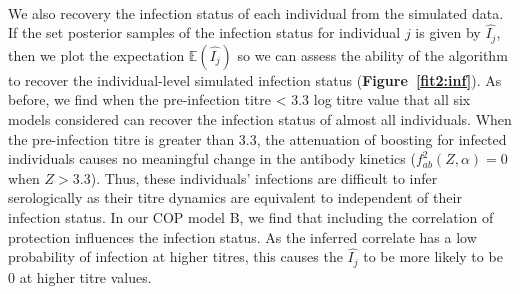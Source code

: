 \paragraph{}We also recovery the infection status of each individual from the simulated data. If the set posterior samples of the infection status for individual $j$ is given by $\hat{I_j} $, then we plot the expectation $\mathbb{E}(\hat{I_j} )$ so we can assess the ability of the algorithm to recover the individual-level simulated infection status (\textbf{Figure~\ref{fit2:inf}}). As before, we find when the pre-infection titre < 3.3 log titre value that all six models considered can recover the infection status of almost all individuals. When the pre-infection titre is greater than 3.3, the attenuation of boosting for infected individuals causes no meaningful change in the antibody kinetics ($f^2_{ab}(Z, \alpha) = 0$ when $Z > 3.3$). Thus, these individuals' infections are difficult to infer serologically as their titre dynamics are equivalent to independent of their infection status. In our COP model B, we find that including the correlation of protection influences the infection status. As the inferred correlate has a low probability of infection at higher titres, this causes the $\hat{I_j}$ to be more likely to be 0 at higher titre values. 


